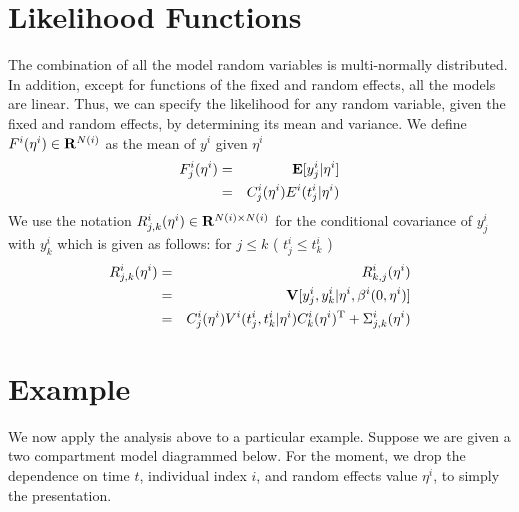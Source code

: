 \documentclass{article}
\newcommand{\BE}{{\bf E}}
\newcommand{\BR}{{\bf R}}
\newcommand{\RT}{{\rm T}}
\newcommand{\BV}{{\bf V}}
\begin{document}
\section{Likelihood Functions}
The combination of all the model random variables 
is multi-normally distributed.
In addition, except for functions of the fixed
and random effects, all the models are linear.
Thus, we can specify the likelihood for any random variable,
given the fixed and random effects, by determining its mean and variance.
We define \( F^i ( \eta^i ) \in \BR^{N(i)} \) as the mean of
\( y^i \) given \( \eta^i \)
\begin{eqnarray*}
F^i_j ( \eta^i )
& = &
\BE [ y_j^i | \eta^i ] 
\\
& = & 
C^i_j ( \eta^i ) E^i ( t_j^i | \eta^i )
\end{eqnarray*}
We use the notation
\( R_{j,k}^i ( \eta^i ) \in \BR^{N(i) \times N(i)} \) 
for the conditional covariance of \( y^i_j \) with \( y^i_k \)
which is given as follows:
for \( j \leq k \) ( \( t_j^i \leq t_k^i \) )
\begin{eqnarray*}
R_{j,k}^i ( \eta^i )
& = &
R_{k,j}^i ( \eta^i )
\\
& = &
\BV [ y_j^i , y_k^i | \eta^i , \beta^i ( 0 , \eta^i ) ]
\\
& = &
C^i_j ( \eta^i ) V^i ( t_j^i , t_k^i | \eta^i ) C^i_k ( \eta^i )^\RT
+
\Sigma^i_{j,k} ( \eta^i )
\end{eqnarray*}

\section{Example}
We now apply the analysis above to a particular example.
Suppose we are given a two compartment model diagrammed below.
For the moment, we
drop the dependence on time \( t \),
individual index \( i \),
and random effects value \( \eta^i \),
to simply the presentation.
\end{document}
